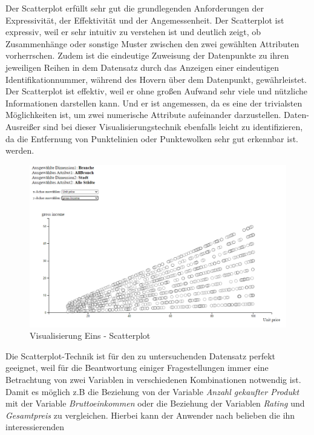 \documentclass[usegeometry=true]{scrartcl}
\begin{document}
\noindent Der Scatterplot erfüllt sehr gut die grundlegenden Anforderungen der Expressivität, der Effektivität und der Angemessenheit. Der Scatterplot ist expressiv, weil er
sehr intuitiv zu verstehen ist und deutlich zeigt, ob Zusammenhänge oder sonstige Muster zwischen den zwei gewählten Attributen vorherrschen. Zudem ist die eindeutige
Zuweisung der Datenpunkte zu ihren jeweiligen Reihen in dem Datensatz durch das Anzeigen einer eindeutigen Identifikationnummer, während des Hovern über dem
Datenpunkt, gewährleistet. Der Scatterplot ist effektiv, weil er ohne großen Aufwand sehr viele und nützliche Informationen darstellen kann. Und er ist angemessen, da
es eine der trivialsten Möglichkeiten ist, um zwei numerische Attribute aufeinander darzustellen. Daten-Ausreißer sind bei dieser Visualisierungstechnik ebenfalls leicht zu
identifizieren, da die Entfernung von Punktelinien oder Punktewolken sehr gut erkennbar ist.
werden.\\
\begin{figure} [H]
	\begin{center}
		\includegraphics[width=13cm]{IMG/Scatterplot}
		\caption{Visualisierung Eins - Scatterplot}
		\label{fig:Scatterplot}
	\end{center}
\end{figure}
\noindent Die Scatterplot-Technik ist für den zu untersuchenden Datensatz perfekt geeignet, weil für die Beantwortung einiger Fragestellungen immer eine Betrachtung von
zwei Variablen in verschiedenen Kombinationen notwendig ist. Damit es möglich z.B die Beziehung von der Variable \textit{Anzahl gekaufter Produkt} mit der Variable
\textit{Bruttoeinkommen} oder die Beziehung der Variablen \textit{Rating} und \textit{Gesamtpreis} zu vergleichen. Hierbei kann der Anwender nach belieben die ihn interessierenden
\end{document}
